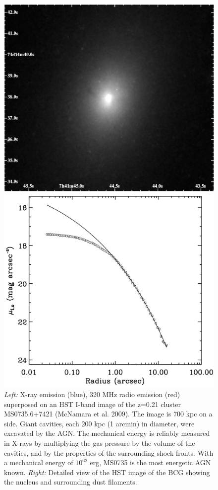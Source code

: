 \documentclass[12pt]{article}
\begin{document}
\begin{figure}[ht]
\begin{center}
\begin{minipage}{0.52\linewidth}
      \includegraphics*[width=\textwidth]{fig4a}
    \end{minipage}
    \caption{{\it{Left:}} X-ray 
emission (blue), 320 MHz radio emission (red) superposed on an HST I-band image of the 
z=0.21 cluster MS0735.6+7421 (McNamara et al. 2009).  The image is 700 kpc on a 
side.  Giant cavities, each 200 kpc (1 arcmin) in diameter, were excavated by the 
AGN.  The mechanical energy is reliably measured in X-rays by multiplying the gas 
pressure by the volume of the cavities, and by the properties of the surrounding 
shock fronts.  With a mechanical energy of $10^{62}$ erg, MS0735 is the most energetic 
AGN known. {\it{Right:}} Detailed view of the HST image of the BCG showing the nucleus and
surrounding dust filaments.}
    \begin{minipage}{0.52\linewidth}    
      \includegraphics*[width=\textwidth, trim=15mm 5mm 0mm 10mm, clip]{fig9}

\end{minipage}
\end{center}
\end{figure}
\end{document}
